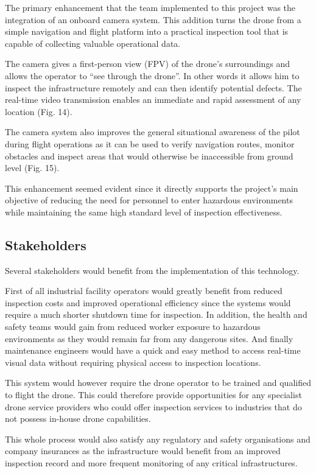 \documentclass[conference]{IEEEtran}
\begin{document}
The primary enhancement that the team implemented to this project was the integration of an onboard camera system. This addition turns the drone from a simple navigation and flight platform into a practical inspection tool that is capable of collecting valuable operational data.

The camera gives a first-person view (FPV) of the drone’s surroundings and allows the operator to “see through the drone”. In other words it allows him to inspect the infrastructure remotely and can then identify potential defects. The real-time video transmission enables an immediate and rapid assessment of any location (Fig. 14).

The camera system also improves the general situational awareness of the pilot during flight operations as it can be used to verify navigation routes, monitor obstacles and inspect areas that would otherwise be inaccessible from ground level (Fig. 15).

This enhancement seemed evident since it directly supports the project’s main objective of reducing the need for personnel to enter hazardous environments while maintaining the same high standard level of inspection effectiveness.

\subsection*{Stakeholders}

Several stakeholders would benefit from the implementation of this technology.

First of all industrial facility operators would greatly benefit from reduced inspection costs and improved operational efficiency since the systems would require a much shorter shutdown time for inspection. In addition, the health and safety teams would gain from reduced worker exposure to hazardous environments as they would remain far from any dangerous sites. And finally maintenance engineers would have a quick and easy method to access real-time visual data without requiring physical access to inspection locations.

This system would however require the drone operator to be trained and qualified to flight the drone. This could therefore provide opportunities for any specialist drone service providers who could offer inspection services to industries that do not possess in-house drone capabilities.

This whole process would also satisfy any regulatory and safety organisations and company insurances as the infrastructure would benefit from an improved inspection record and more frequent monitoring of any critical infrastructures.
\end{document}
